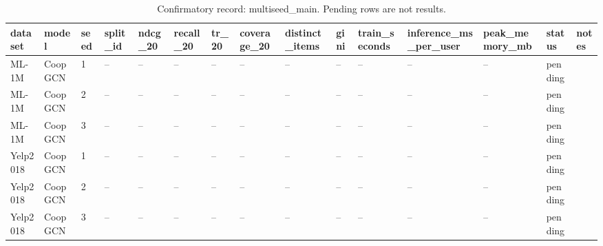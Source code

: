 \begin{table}[t]
\centering
\caption{Confirmatory record: multiseed\_main. Pending rows are not results.}
\begin{tabular}{lllllllllllllll}
\toprule
\textbf{dataset} & \textbf{model} & \textbf{seed} & \textbf{split\_id} & \textbf{ndcg\_20} & \textbf{recall\_20} & \textbf{tr\_20} & \textbf{coverage\_20} & \textbf{distinct\_items} & \textbf{gini} & \textbf{train\_seconds} & \textbf{inference\_ms\_per\_user} & \textbf{peak\_memory\_mb} & \textbf{status} & \textbf{notes} \\
\midrule
ML-1M & CoopGCN & 1 & -- & -- & -- & -- & -- & -- & -- & -- & -- & -- & pending &  \\
ML-1M & CoopGCN & 2 & -- & -- & -- & -- & -- & -- & -- & -- & -- & -- & pending &  \\
ML-1M & CoopGCN & 3 & -- & -- & -- & -- & -- & -- & -- & -- & -- & -- & pending &  \\
Yelp2018 & CoopGCN & 1 & -- & -- & -- & -- & -- & -- & -- & -- & -- & -- & pending &  \\
Yelp2018 & CoopGCN & 2 & -- & -- & -- & -- & -- & -- & -- & -- & -- & -- & pending &  \\
Yelp2018 & CoopGCN & 3 & -- & -- & -- & -- & -- & -- & -- & -- & -- & -- & pending &  \\
\bottomrule
\end{tabular}
\end{table}
